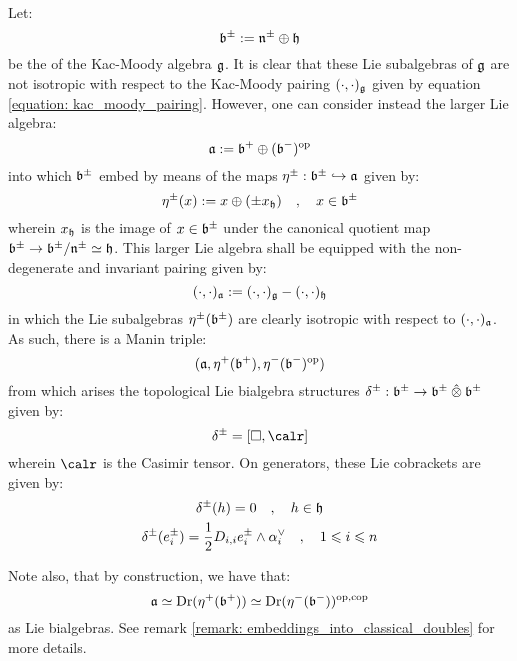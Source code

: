 

Let:
    $$\mathfrak{b}^{\pm} := \mathfrak{n}^{\pm} \oplus \mathfrak{h}$$
be the  of the Kac-Moody algebra $\mathfrak{g}$. It is clear that these Lie subalgebras of $\mathfrak{g}$ are not isotropic with respect to the Kac-Moody pairing $(\cdot, \cdot)_{\mathfrak{g}}$ given by equation \eqref{equation: kac_moody_pairing}. However, one can consider instead the larger Lie algebra:
    $$\mathfrak{a} := \mathfrak{b}^+ \oplus (\mathfrak{b}^-)^{\mathrm{op}}$$
into which $\mathfrak{b}^{\pm}$ embed by means of the maps $\eta^{\pm}: \mathfrak{b}^{\pm} \hookrightarrow \mathfrak{a}$ given by:
    \begin{equation} \label{equation: embeddings_into_classical_borel_double}
        \eta^{\pm}(x) := x \oplus ( \pm x_{\mathfrak{h}} ) \quad, \quad x \in \mathfrak{b}^{\pm}
    \end{equation}
wherein $x_{\mathfrak{h}}$ is the image of $x \in \mathfrak{b}^{\pm}$ under the canonical quotient map $\mathfrak{b}^{\pm} \to \mathfrak{b}^{\pm}/\mathfrak{n}^{\pm} \simeq \mathfrak{h}$. This larger Lie algebra shall be equipped with the non-degenerate and invariant pairing given by:
    $$(\cdot, \cdot)_{\mathfrak{a}} := (\cdot, \cdot)_{\mathfrak{g}} - (\cdot, \cdot)_{\mathfrak{h}}$$
in which the Lie subalgebras $\eta^{\pm}(\mathfrak{b}^{\pm})$ are clearly isotropic with respect to $(\cdot, \cdot)_{\mathfrak{a}}$. As such, there is a Manin triple:
    \begin{equation} \label{equation: standard_borel_manin_triple}
        (\mathfrak{a}, \eta^+(\mathfrak{b}^+), \eta^-(\mathfrak{b}^-)^{\mathrm{op}})
    \end{equation}
from which arises the topological Lie bialgebra structures $\delta^{\pm}: \b^{\pm} \to \b^{\pm} \hattensor \b^{\pm}$ given by:
    $$\delta^{\pm} = [\Box, \calr]$$
wherein $\calr$ is the Casimir tensor. On generators, these Lie cobrackets are given by:
    \begin{equation} \label{equation: standard_borel_lie_bialgebra_structure}
        \begin{gathered}
            \delta^{\pm}(h) = 0 \quad, \quad h \in \mathfrak{h}
            \\
            \delta^{\pm}(e_i^{\pm}) = \frac12 D_{i, i} e_i^{\pm} \wedge \alpha_i^{\vee} \quad, \quad 1 \leqslant i \leqslant n
        \end{gathered}
    \end{equation}
\begin{remark}
    Note also, that by construction, we have that:
        $$\mathfrak{a} \simeq \operatorname{Dr}( \eta^+( \mathfrak{b}^+ ) ) \simeq \operatorname{Dr}(\eta^-(\mathfrak{b}^-))^{\mathrm{op}, \mathrm{cop}}$$
    as Lie bialgebras. See remark \ref{remark: embeddings_into_classical_doubles} for more details.
\end{remark}
    
